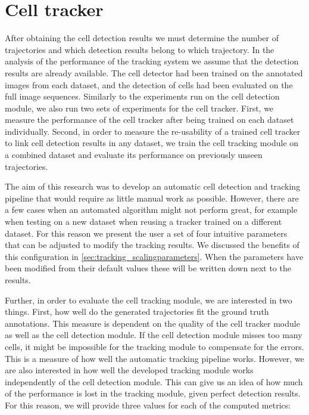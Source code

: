 \section{Cell tracker }
	\label{sec:results_tracker}
	
	After obtaining the cell detection results we must determine the number of trajectories and which detection results belong to which trajectory. In the analysis of the performance of the tracking system we assume that the detection results are already available. The cell detector had been trained on the annotated images from each dataset, and the detection of cells had been evaluated on the full image sequences. Similarly to the experiments run on the cell detection module, we also run two sets of experiments for the cell tracker. First, we measure the performance of the cell tracker after being trained on each dataset individually. Second, in order to measure the re-usability of a trained cell tracker to link cell detection results in any dataset, we train the cell tracking module on a combined dataset and evaluate its performance on previously unseen trajectories.
	
	The aim of this research was to develop an automatic cell detection and tracking pipeline that would require as little manual work as possible. However, there are a few cases when an automated algorithm might not perform great, for example when testing on a new dataset when reusing a tracker trained on a different dataset. For this reason we present the user a set of four intuitive parameters that can be adjusted to modify the tracking results. We discussed the benefits of this configuration in \cref{sec:tracking_scalingparameters}. When the parameters have been modified from their default values these will be written down next to the results.
	
	Further, in order to evaluate the cell tracking module, we are interested in two things. First, how well do the generated trajectories fit the ground truth annotations. This measure is dependent on the quality of the cell tracker module as well as the cell detection module. If the cell detection module misses too many cells, it might be impossible for the tracking module to compensate for the errors. This is a measure of how well the automatic tracking pipeline works. However, we are also interested in how well the developed tracking module works independently of the cell detection module. This can give us an idea of how much of the performance is lost in the tracking module, given perfect detection results. For this reason, we will provide three values for each of the computed metrics:
	
